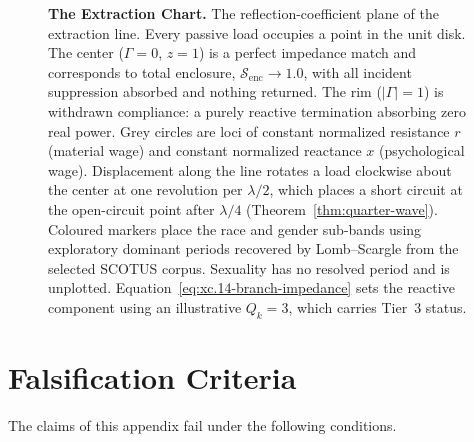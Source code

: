 \begin{figure}[htbp]
\caption[The Extraction Chart]{\textbf{The Extraction Chart.} The reflection-coefficient plane of
the extraction line. Every passive load occupies a point in the unit disk. The center
($\Gamma = 0$, $z = 1$) is a perfect impedance match and corresponds to total enclosure,
$\mathcal{S}_{\text{enc}} \to 1.0$, with all incident suppression absorbed and nothing returned. The
rim ($|\Gamma| = 1$) is withdrawn compliance: a purely reactive termination absorbing zero real
power. Grey circles are loci of constant normalized resistance $r$ (material wage) and constant
normalized reactance $x$ (psychological wage). Displacement along the line rotates a load clockwise
about the center at one revolution per $\lambda/2$, which places a short circuit at the open-circuit
point after $\lambda/4$ (Theorem~\ref{thm:quarter-wave}). Coloured markers place the race and gender
sub-bands using exploratory dominant periods recovered by Lomb--Scargle from the selected SCOTUS
corpus. Sexuality has no resolved period and is unplotted. Equation~\ref{eq:xc.14-branch-impedance}
sets the reactive component using an illustrative $Q_k = 3$, which carries Tier~3 status.}
\label{fig:extraction_chart}
\end{figure}

\section{Falsification Criteria}
\label{sec:xc_falsification}

The claims of this appendix fail under the following conditions.

